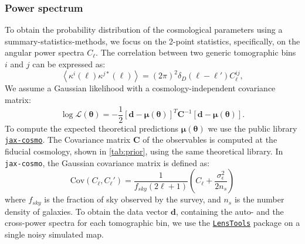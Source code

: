 \documentclass{aa}
\begin{document}
\subsubsection{Power spectrum}
To obtain the probability distribution of the cosmological parameters using a summary-statistics-methods, we focus on the 2-point statistics, specifically, on the angular power spectra $C_{\ell}$.
The correlation between two generic tomographic bins $i$ and $j$ can be expressed as:
\begin{equation}
    \left \langle \kappa^{i}(\ell)\kappa^{j*}(\ell)\right \rangle =(2\pi)^2\delta_D(\ell-\ell')C_{\ell}^{ij},
\end{equation}
We assume a Gaussian likelihood with a cosmology-independent covariance matrix:
\begin{equation}
    \log{\mathcal{L}}(\bm{\theta})=-\frac{1}{2}[\bm{d}-\bm{\mu}(\bm{\theta})]^{T}\bm{C}^{-1}[\bm{d}-\bm{\mu}(\bm{\theta})].
\end{equation}
To compute the expected theoretical predictions $\bm{\mu}(\bm{\theta})$ we use the public library \href{https://github.com/DifferentiableUniverseInitiative/jax_cosmo}{\texttt{jax-cosmo}}. 
 The Covariance matrix $\bm{C}$ of the observables is computed at the fiducial cosmology, shown in \autoref{tab:prior}, using the same theoretical library. In {\texttt{jax-cosmo}}, the Gaussian covariance matrix is defined as:
\begin{equation}
    \text{Cov}(C_{\ell},C_{\ell}')=\frac{1}{f_{sky}(2 \ell+1)}\left(C_{\ell}+\frac{\sigma_{\epsilon}^2}{2n_s}\right)
\end{equation}
where $f_{sky}$ is the fraction of sky observed by the survey, and $n_s$ is the number density of galaxies. 
To obtain the data vector $\bm{d}$, containing the auto- and the cross-power spectra for each tomographic bin, we use the \href{https://lenstools.readthedocs.io/en/latest/lenstool} {\texttt{LensTools}} package \citep{2016A&C....17...73P} on a single noisy simulated map. 
\end{document}
